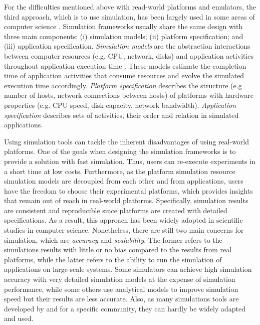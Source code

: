 For the difficulties mentioned above with read-world platforms 
and emulators, the third approach, which is to use simulation, has been  
largely used in some areas of computer science \cite{casanova2008simgrid}.  
Simulation frameworks usually share the same design with three main 
components: (i) simulation models; (ii) platform specification; 
and (iii) application specification.
\textit{Simulation models} are the abstraction interactions between computer 
resources (e.g. CPU, network, disks) and application activities throughout 
application execution time . 
These models estimate the completion time of application activities 
that consume resources and evolve the simulated execution time accordingly.
\textit{Platform specification} describes the structure (e.g number of hosts, 
network connections between hosts) of platforms with hardware properties 
(e.g. CPU speed, disk capacity, network bandwidth).
\textit{Application specification} describes sets of activities, their order 
and relation in simulated applications.

Using simulation tools can tackle the inherent disadvantages of using 
real-world platforms. 
One of the goals when designing the simulation frameworks is to provide 
a solution with fast simulation. 
Thus, users can re-execute experiments in a short time at low costs.
Furthermore, as the platform simulation resource simulation models 
are decoupled from each other and from applications, users have 
the freedom to choose their experimental platforms, which provides
insights that remain out of reach in real-world platforms. 
Specifically, simulation results are consistent and reproducible since 
platforms are created with detailed specifications. 
As a result, this approach has been widely adopted in scientific studies
in computer science. 
Nonetheless, there are still two main concerns for simulation, which 
are \textit{accuracy} and \textit{scalability}. The former refers to the 
simulations results with little or no bias compared to the results from 
real platforms, while the latter refers to the ability to run the simulation 
of applications on large-scale systems. 
Some simulators can achieve high simulation accuracy with very detailed 
simulation models at the expense of simulation performance, while 
some others use analytical models to improve simulation speed but 
their results are less accurate.
Also, as many simulations tools are developed by and for a specific community, 
they can hardly be widely adapted and used.

